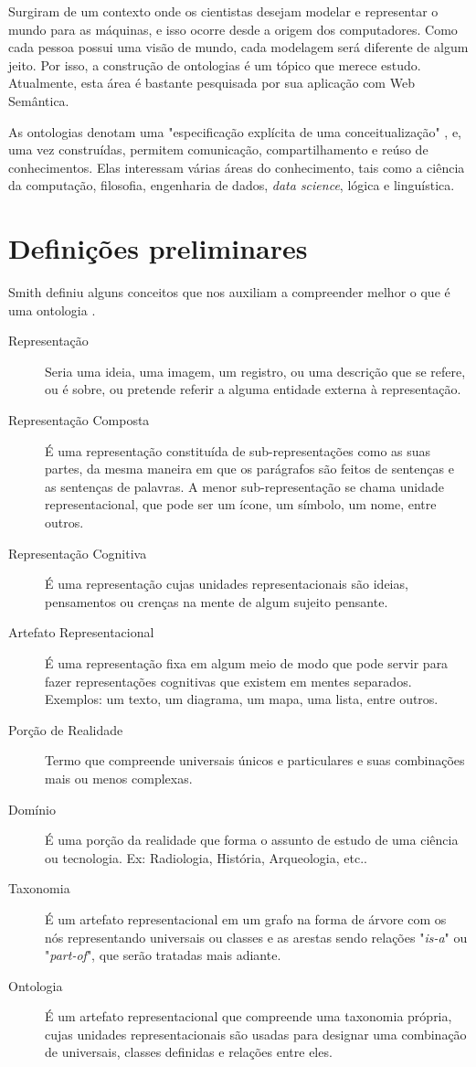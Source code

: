 Surgiram de um contexto onde os cientistas desejam modelar e representar o mundo para as máquinas, e isso ocorre desde a origem dos computadores. Como cada pessoa possui uma visão de mundo, cada modelagem será diferente de algum jeito. Por isso, a construção de ontologias é um tópico que merece estudo. Atualmente, esta área é bastante pesquisada por sua aplicação com Web Semântica. 

As ontologias denotam uma "especificação explícita de uma conceitualização"  \citep{ontoGruber}, e, uma vez construídas, permitem comunicação, compartilhamento e reúso de conhecimentos. Elas interessam várias áreas do conhecimento, tais como a ciência da computação, filosofia, engenharia de dados, \textit{data science}, lógica e linguística.

\section{Definições preliminares}

Smith definiu alguns conceitos que nos auxiliam a compreender melhor o que é uma ontologia \citep{ontoSmith}.

\begin{description}
	\item[Representação] Seria uma ideia, uma imagem, um registro, ou uma descrição que se refere, ou é sobre, ou pretende referir a alguma entidade externa à representação.
	\item[Representação Composta] É uma representação constituída de sub-representações como as suas partes, da mesma maneira em que os parágrafos são feitos de sentenças e as sentenças de palavras. A menor sub-representação se chama unidade representacional, que pode ser um ícone, um símbolo, um nome, entre outros.
	\item[Representação Cognitiva] É uma representação cujas unidades representacionais são ideias, pensamentos ou crenças na mente de algum sujeito pensante.
	\item[Artefato Representacional] É uma representação fixa em algum meio de modo que pode servir para fazer representações cognitivas que existem em mentes separados. Exemplos: um texto, um diagrama, um mapa, uma lista, entre outros.
	\item[Porção de Realidade] Termo que compreende universais únicos e particulares e suas com\-bi\-na\-ções mais ou menos complexas.
	\item[Domínio] É uma porção da realidade que forma o assunto de estudo de uma ciência ou tecnologia. Ex: Radiologia, História, Arqueologia, etc..
	\item[Taxonomia] É um artefato representacional em um grafo na forma de árvore com os nós representando universais ou classes e as arestas sendo relações "\textit{is-a}" ou "\textit{part-of}", que serão tratadas mais adiante.
	\item[Ontologia] É um artefato representacional que compreende uma taxonomia própria, cujas unidades representacionais são usadas para designar uma combinação de universais, classes definidas e relações entre eles.
\end{description} 

